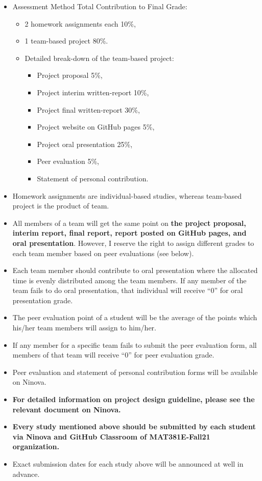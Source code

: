 \documentclass[
  12pt,
]{article}
\providecommand{\tightlist}{%
  \setlength{\itemsep}{0pt}\setlength{\parskip}{0pt}}
\begin{document}
\begin{itemize}
\item
  Assessment Method Total Contribution to Final Grade:

  \begin{itemize}
  \tightlist
  \item
    2 homework assignments each 10\%,
  \item
    1 team-based project 80\%.
  \item
    Detailed break-down of the team-based project:

    \begin{itemize}
    \tightlist
    \item
      Project proposal 5\%,
    \item
      Project interim written-report 10\%,
    \item
      Project final written-report 30\%,
    \item
      Project website on GitHub pages 5\%,
    \item
      Project oral presentation 25\%,
    \item
      Peer evaluation 5\%,
    \item
      Statement of personal contribution.
    \end{itemize}
  \end{itemize}
\item
  Homework assignments are individual-based studies, whereas team-based
  project is the product of team.
\item
  All members of a team will get the same point on \textbf{the project
  proposal, interim report, final report, report posted on GitHub pages,
  and oral presentation}. However, I reserve the right to assign
  different grades to each team member based on peer evaluations (see
  below).
\item
  Each team member should contribute to oral presentation where the
  allocated time is evenly distributed among the team members. If any
  member of the team fails to do oral presentation, that individual will
  receive ``0'' for oral presentation grade.
\item
  The peer evaluation point of a student will be the average of the
  points which his/her team members will assign to him/her.
\item
  If any member for a specific team fails to submit the peer evaluation
  form, all members of that team will receive ``0'' for peer evaluation
  grade.
\item
  Peer evaluation and statement of personal contribution forms will be
  available on Ninova.
\item
  \textbf{For detailed information on project design guideline, please
  see the relevant document on Ninova.}
\item
  \textbf{Every study mentioned above should be submitted by each
  student via Ninova and GitHub Classroom of MAT381E-Fall21
  organization.}
\item
  Exact submission dates for each study above will be announced at well
  in advance.
\end{itemize}
\end{document}
